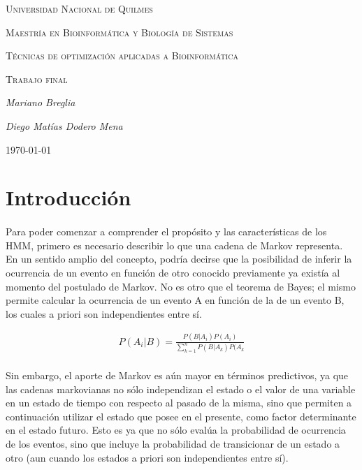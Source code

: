 \documentclass[11pt,a4paper]{article}
\begin{document}
\begin{titlepage}
	\centering
	{\scshape\LARGE Universidad Nacional de Quilmes\par}
	\vspace{1cm}
	{\scshape\LARGE Maestría en Bioinformática y Biología de Sistemas\par}
	\vspace{1cm}
	{\scshape\LARGE Técnicas de optimización aplicadas a Bioinformática}
	\vspace{1cm}
	{\scshape\Large Trabajo final\par}
	\vspace{1.5cm}
	{\Large\itshape Mariano Breglia\par}
	{\Large\itshape Diego Matías Dodero Mena\par}

	\vfill

	{\large \today\par}

\end{titlepage}

\section{Introducción}
\paragraph{}
Para poder comenzar a comprender el propósito y las características de los HMM, primero es necesario describir lo que una cadena de Markov representa.
En un sentido amplio del concepto, podría decirse que la posibilidad de inferir la ocurrencia de un evento en función de otro conocido previamente ya existía al momento del postulado de Markov. No es otro que el teorema de Bayes; el mismo permite calcular la ocurrencia de un evento A en función de la de un evento B, los cuales a priori son independientes entre sí.

\begin{align*}
 P(A_i|B) = \frac{P(B|A_i) P(A_i)}{\sum_{k = 1}^{n} P(B|A_k)P(A_k}
\end{align*}


\paragraph{}
Sin embargo, el aporte de Markov es aún mayor en términos predictivos, ya que las cadenas markovianas no sólo independizan el estado o el valor de una variable en un estado de tiempo con respecto al pasado de la misma, sino que permiten a continuación utilizar el estado que posee en el presente, como factor determinante en el estado futuro. Esto es ya que no sólo evalúa la probabilidad de ocurrencia de los eventos, sino que incluye la probabilidad de transicionar de un estado a otro (aun cuando los estados a priori son independientes entre sí).
\end{document}
